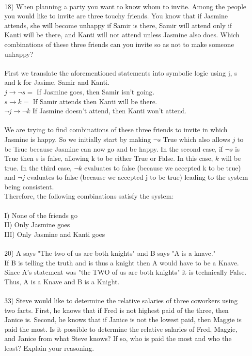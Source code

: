 \documentclass{article}
\begin{document}
\begin{flushleft}
~\\\setlength\parindent{0pt}18) When planning a party you want to know whom to invite.  Among the people you would like to invite are three touchy friends.  You know that if Jasmine attends, she will become unhappy if Samir is there, Samir will attend only if Kanti will be there, and Kanti will not attend unless Jasmine also does.  Which combinations of these three friends can you invite so as not to make someone unhappy?\\
~\\
First we translate the aforementioned statements into symbolic logic using j, s and k for Jasime, Samir and Kanti.\\
$j \rightarrow \neg s = $ If Jasmine goes, then Samir isn't going. \\
$s \rightarrow k = $ If Samir attends then Kanti will be there.\\
$\neg j \rightarrow \neg k$ If Jasmine doesn't attend, then Kanti won't attend. \\ 
~\\
We are trying to find combinations of these three friends to invite in which Jasmine is happy.  So we initially start by making $\neg s$ True which also allows $j$ to be True because Jasmine can now go and be happy.  In the second case, if $\neg s $ is True then s is false, allowing k to be either True or False.  In this case,  $k$ will be true.  In the third case, $\neg k $ evaluates to false (because we accepted k to be true) and $\neg j $ evaluates to false (because we accepted j to be true) leading to the system being consistent.\\
Therefore, the following combinations satisfy the system:\\
~\\I) None of the friends go\\
II) Only Jasmine goes\\
III) Only Jasmine and Kanti goes\\
~\\
\setlength\parindent{0pt}20) A says "The two of us are both knights" and B says "A is a knave." \\
If B is telling the truth and is thus a knight then A would have to be a Knave.  Since A's statement was "the TWO of us are both knights" it is technically False.  Thus, A is a Knave and B is a Knight. \\
~\\
\setlength\parindent{0pt}33) Steve would like to determine the relative salaries of three coworkers using two facts.  First, he knows that if Fred is not highest paid of the three, then Janice is.  Second, he knows that if Janice is not the lowest paid, then Maggie is paid the most.  Is it possible to determine the relative salaries of Fred, Maggie, and Janice from what Steve knows?  If so, who is paid the most and who the least?  Explain your reasoning.\\

\end{flushleft}
\end{document}
